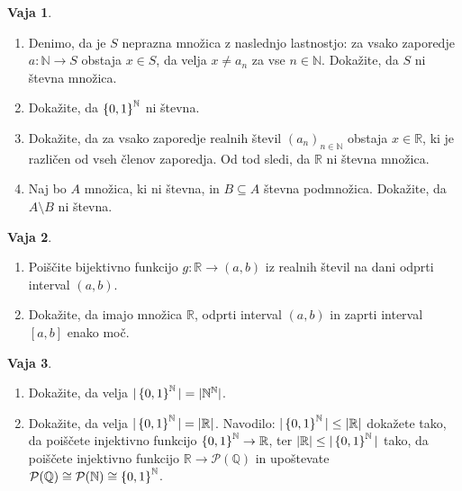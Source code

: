 \documentclass{article}
\newcommand{\pow}{\mathcal{P}}
\newcommand{\NN}{\mathbb{N}}
\newcommand{\QQ}{\mathbb{Q}}
\newcommand{\RR}{\mathbb{R}}
\theoremstyle{definition}
\newtheorem{vaja}{Vaja}
\begin{document}
\begin{vaja}
  \
  \begin{enumerate}
    \item
      Denimo, da je $S$ neprazna množica z naslednjo lastnostjo: za vsako zaporedje $a\colon \NN \to S$ obstaja $x \in S$, da velja $x \neq a_n$ za vse $n \in \NN$. Dokažite, da $S$ ni števna množica.
    \item
      Dokažite, da $\set{0,1}^\NN$ ni števna.
    \item
      Dokažite, da za vsako zaporedje realnih števil $(a_n)_{n \in \NN}$ obstaja $x \in \RR$, ki je različen od vseh členov zaporedja. Od tod sledi, da $\RR$ ni števna množica.
    \item
      Naj bo $A$ množica, ki ni števna, in $B \subseteq A$ števna podmnožica. Dokažite, da $A \setminus B$ ni števna.
  \end{enumerate}
\end{vaja}

\begin{vaja}
  \
  \begin{enumerate}
    \item
      Poiščite bijektivno funkcijo $g\colon \RR \to (a,b)$ iz realnih števil na dani odprti interval $(a,b)$.
    \item
      Dokažite, da imajo množica $\RR$, odprti interval $(a,b)$ in zaprti interval $[a,b]$ enako moč.
  \end{enumerate}
\end{vaja}


\begin{vaja}
  \
  \begin{enumerate}
    \item
      Dokažite, da velja $|\set{0,1}^\NN| = |\NN^\NN|$.
    \item
      Dokažite, da velja $|\set{0,1}^\NN| = |\RR|$. Navodilo: $|\set{0,1}^\NN| \leq |\RR|$ dokažete tako, da poiščete injektivno funkcijo $\set{0,1}^\NN \to \RR$, ter $|\RR| \leq |\set{0,1}^\NN|$ tako, da poiščete injektivno funkcijo $\RR \to \pow(\QQ)$ in upoštevate $\pow(\QQ) \cong \pow(\NN) \cong \set{0,1}^\NN$.
  \end{enumerate}
\end{vaja}
\end{document}
